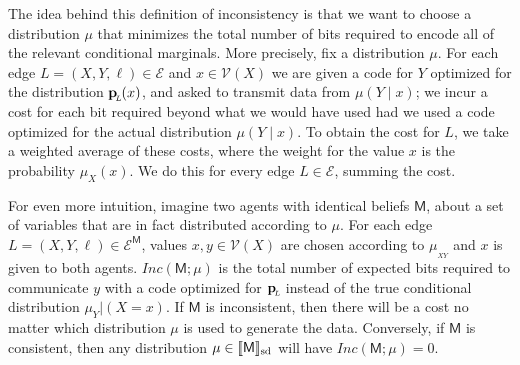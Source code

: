\documentclass{article}
\DeclarePairedDelimiter{\SD}{\llbracket}{\rrbracket_{\text{sd}}}
\newcommand{\bp}[1][L]{\mat{p}_{\!_#1\!}}
\newcommand{\V}{\mathcal V}
\newcommand{\Ed}{\mathcal E}
\newcommand{\sfM}{\mathsf M}
\newcommand\inconsist{\mathit{Inc}}
\numberwithin{equation}{section}
\begin{document}
        The idea behind this definition of inconsistency is that
 	we want to choose a distribution $\mu$ that minimizes the
        total number of bits required to encode all of the relevant
        conditional marginals. 
 	More precisely, fix a distribution $\mu$. For each edge $L = (X, Y,
        \ell) \in \Ed$ and $x \in \V(X)$ we are given a code
        for $Y$ optimized for the distribution $\bp(x)$, and asked to transmit
        data from $\mu(Y\mid x)$; we incur a cost for each bit required beyond what we would have used had we used a code optimized for the actual distribution $\mu(Y\mid x)$. 
       To obtain the cost for $L$, we take a weighted average of these costs, where the weight for the value $x$ is the probability $\mu_X(x)$. We do this for every edge $L \in \Ed$, summing the cost.

	For even more intuition, imagine two agents with identical
        beliefs $\sfM$, about a set of variables that are in fact
        distributed according to $\mu$. For each edge $L = (X,Y, \ell)
        \in \Ed^\sfM$, values $x,y \in \V(X)$ are chosen according to
        $\mu_{_{XY}}$ and $x$ is given to both
        agents. $\inconsist(\sfM;\mu)$ is the total number of expected
        bits required to communicate $y$ with a code optimized for
        $\bp$ instead of the true conditional distribution
        $\mu_Y|(X=x)$. 
	If $\sfM$ is inconsistent, then there will be a cost no matter which distribution $\mu$ is used to generate the data.
	Conversely, if $\sfM$ is consistent, then any distribution $\mu \in \SD{\sfM}$ will have $\inconsist(\sfM; \mu) = 0$. 
	
\end{document}

